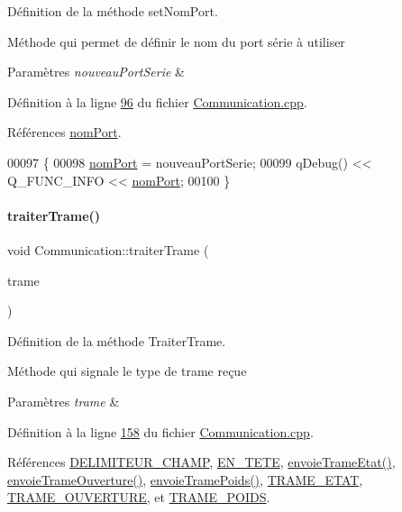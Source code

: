 Définition de la méthode set\+Nom\+Port. 

Méthode qui permet de définir le nom du port série à utiliser 
\begin{DoxyParams}{Paramètres}
{\em nouveau\+Port\+Serie} & \\
\hline
\end{DoxyParams}


Définition à la ligne \hyperlink{_communication_8cpp_source_l00096}{96} du fichier \hyperlink{_communication_8cpp_source}{Communication.\+cpp}.



Références \hyperlink{_communication_8h_source_l00069}{nom\+Port}.


\begin{DoxyCode}
00097 \{
00098     \hyperlink{class_communication_a5fa89ee1fc732871f3f8f177fb50bf2a}{nomPort} = nouveauPortSerie;
00099     qDebug() << Q\_FUNC\_INFO << \hyperlink{class_communication_a5fa89ee1fc732871f3f8f177fb50bf2a}{nomPort};
00100 \}
\end{DoxyCode}
\mbox{\label{class_communication_ab4ff84d0fb69ffa990bc61939c95a093}} 
\paragraph{\texorpdfstring{traiter\+Trame()}{traiterTrame()}}
{\footnotesize\ttfamily void Communication\+::traiter\+Trame (\begin{DoxyParamCaption}\item[{Q\+String}]{trame }\end{DoxyParamCaption})\hspace{0.3cm}{\ttfamily [private]}}



Définition de la méthode Traiter\+Trame. 

Méthode qui signale le type de trame reçue 
\begin{DoxyParams}{Paramètres}
{\em trame} & \\
\hline
\end{DoxyParams}


Définition à la ligne \hyperlink{_communication_8cpp_source_l00158}{158} du fichier \hyperlink{_communication_8cpp_source}{Communication.\+cpp}.



Références \hyperlink{_communication_8h_source_l00026}{D\+E\+L\+I\+M\+I\+T\+E\+U\+R\+\_\+\+C\+H\+A\+MP}, \hyperlink{_communication_8h_source_l00025}{E\+N\+\_\+\+T\+E\+TE}, \hyperlink{class_communication_a8beb7417ede75d0056b06788ef72d21b}{envoie\+Trame\+Etat()}, \hyperlink{class_communication_a9fb098f5b5cb8931efefc58984529119}{envoie\+Trame\+Ouverture()}, \hyperlink{class_communication_aaea5653e8aa1b50b4774caf65db21409}{envoie\+Trame\+Poids()}, \hyperlink{_communication_8h_source_l00031}{T\+R\+A\+M\+E\+\_\+\+E\+T\+AT}, \hyperlink{_communication_8h_source_l00030}{T\+R\+A\+M\+E\+\_\+\+O\+U\+V\+E\+R\+T\+U\+RE}, et \hyperlink{_communication_8h_source_l00032}{T\+R\+A\+M\+E\+\_\+\+P\+O\+I\+DS}.




